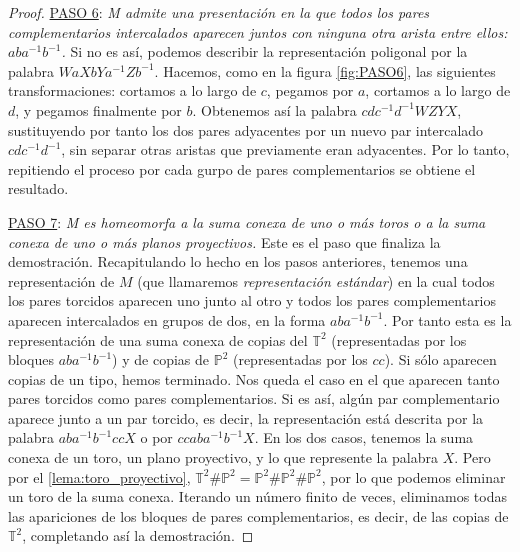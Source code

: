 \documentclass[10pt]{report}
\newcommand{\Toro}{\mathbb{T}^2}
\newcommand{\Proyectivo}{\mathbb{P}^2}
\theoremstyle{definition}
\begin{document}
\begin{proof}
\underline{PASO 6}: \textit{M admite una presentación en la que todos los pares complementarios intercalados aparecen juntos con ninguna otra arista entre ellos: $aba^{-1}b^{-1}$.} Si no es así, podemos describir la representación poligonal por la palabra $WaXbYa^{-1}Zb^{-1}$. Hacemos, como en la figura \autoref{fig:PASO6}, las siguientes transformaciones: cortamos a lo largo de $c$, pegamos por $a$, cortamos a lo largo de $d$, y pegamos finalmente por $b$. Obtenemos así la palabra $cdc^{-1}d^{-1}WZYX$, sustituyendo por tanto los dos pares adyacentes por un nuevo par intercalado $cdc^{-1}d^{-1}$, sin separar otras aristas que previamente eran adyacentes. Por lo tanto, repitiendo el proceso por cada gurpo de pares complementarios se obtiene el resultado.

\underline{PASO 7}: \textit{M es homeomorfa a la suma conexa de uno o más toros o a la suma conexa de uno o más planos proyectivos.} Este es el paso que finaliza la demostración.  Recapitulando lo hecho en los pasos anteriores, tenemos una representación de $M$ (que llamaremos \textit{representación estándar}) en la cual todos los pares torcidos aparecen uno junto al otro y todos los pares complementarios aparecen intercalados en grupos de dos, en la forma $aba^{-1}b^{-1}$. Por tanto esta es la representación de una suma conexa de copias del $\Toro$ (representadas por los bloques $aba^{-1}b^{-1}$) y de copias de $\Proyectivo$ (representadas por los $cc$). Si sólo aparecen copias de un tipo, hemos terminado.
Nos queda el caso en el que aparecen tanto pares torcidos como pares complementarios. Si es así, algún par complementario aparece junto a un par torcido, es decir, la representación está descrita por la palabra $aba^{-1}b^{-1}ccX$ o por $ccaba^{-1}b^{-1}X$. En los dos casos, tenemos la suma conexa de un toro, un plano proyectivo, y lo que represente la palabra $X$. Pero por el \autoref{lema:toro_proyectivo}, $\Toro \# \Proyectivo = \Proyectivo \# \Proyectivo \# \Proyectivo$, por lo que podemos eliminar un toro de la suma conexa. Iterando un número finito de veces, eliminamos todas las apariciones de los bloques de pares complementarios, es decir, de las copias de $\Toro$, completando así la demostración.
\end{proof}
\end{document}
